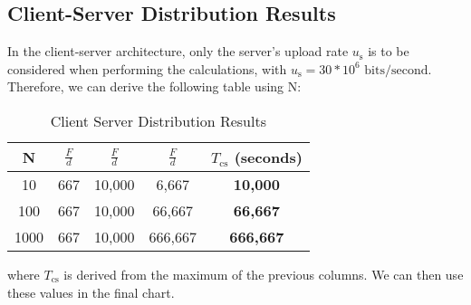 \documentclass{article}
\begin{document}
\subsection{Client-Server Distribution Results}
In the client-server architecture, only the server's upload rate $u_{\text{s}}$ is to be considered when performing the calculations, with $u_{\text{s}} = 30 * 10^6 \text{ bits/second}$. Therefore, we can derive the following table using N:
\begin{table}[htbp]
  \centering
  \begin{tabular}{|c|c|c|c|c|}
    \hline
    N & $\frac{F}{d}$ & $\frac{F}{d}$ & $\frac{F}{d}$ & $T_{\text{cs}}$ (seconds) \\ \hline
    10 & 667 & 10,000 & 6,667 & \textbf{10,000} \\ \hline
    100 & 667 & 10,000 & 66,667 & \textbf{66,667} \\ \hline
    1000 & 667 & 10,000 & 666,667 & \textbf{666,667} \\ \hline
  \end{tabular}
  \caption{Client Server Distribution Results}
\end{table}

where $T_{\text{cs}}$ is derived from the maximum of the previous columns. We can then use these values in the final chart.

\end{document}
